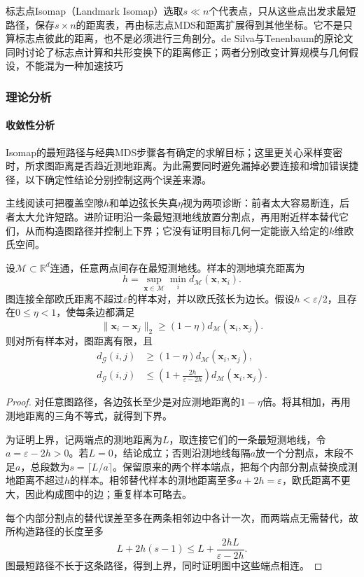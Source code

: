 标志点Isomap（Landmark Isomap）选取$s\ll n$个代表点，只从这些点出发求最短路径，保存$s\times n$的距离表，再由标志点MDS和距离扩展得到其他坐标。它不是只算标志点彼此的距离，也不是必须进行三角剖分。de Silva与Tenenbaum的原论文同时讨论了标志点计算和共形变换下的距离修正；两者分别改变计算规模与几何假设，不能混为一种加速技巧

\subsubsection{理论分析}
\label{sec:dim-isomap-theory}

\paragraph{收敛性分析}

Isomap的最短路径与经典MDS步骤各有确定的求解目标；这里更关心采样变密时，所求图距离是否趋近测地距离。为此需要同时避免漏掉必要连接和增加错误捷径，以下确定性结论分别控制这两个误差来源。

主线阅读可把覆盖空隙$h$和单边弦长失真$\eta$视为两项诊断：前者太大容易断连，后者太大允许短路。进阶证明沿一条最短测地线放置分割点，再用附近样本替代它们，从而构造图路径并控制上下界；它没有证明目标几何一定能嵌入给定的$k$维欧氏空间。

\begin{theorem}[覆盖条件下的图距离界]
  \label{thm:dim-isomap-bound}
  设$\mathcal{M}\subset\mathbb{R}^d$连通，任意两点间存在最短测地线。样本的测地填充距离为
  \[
    h=\sup_{\bm{x}\in\mathcal{M}}\min_i
      d_{\mathcal{M}}(\bm{x},\bm{x}_i).
  \]
  图连接全部欧氏距离不超过$\varepsilon$的样本对，并以欧氏弦长为边长。假设$h<\varepsilon/2$，且存在$0\leq\eta<1$，使每条边都满足
  \[
    \lVert\bm{x}_i-\bm{x}_j\rVert_2
    \geq(1-\eta)d_{\mathcal{M}}(\bm{x}_i,\bm{x}_j).
  \]
  则对所有样本对，图距离有限，且
  \begin{equation}
    \label{eq:dim-isomap-bound}
    \begin{aligned}
      d_{\mathcal{G}}(i,j)
        &\geq(1-\eta)d_{\mathcal{M}}(\bm{x}_i,\bm{x}_j),\\
      d_{\mathcal{G}}(i,j)
        &\leq\left(1+\frac{2h}{\varepsilon-2h}\right)
          d_{\mathcal{M}}(\bm{x}_i,\bm{x}_j).
    \end{aligned}
  \end{equation}
\end{theorem}
\begin{proof}
  对任意图路径，各边弦长至少是对应测地距离的$1-\eta$倍。将其相加，再用测地距离的三角不等式，就得到下界。

  为证明上界，记两端点的测地距离为$L$，取连接它们的一条最短测地线，令$a=\varepsilon-2h>0$。若$L=0$，结论成立；否则沿测地线每隔$a$放一个分割点，末段不足$a$，总段数为$s=\lceil L/a\rceil$。保留原来的两个样本端点，把每个内部分割点替换成测地距离不超过$h$的样本。相邻替代样本的测地距离至多$a+2h=\varepsilon$，欧氏距离不更大，因此构成图中的边；重复样本可略去。

  每个内部分割点的替代误差至多在两条相邻边中各计一次，而两端点无需替代，故所构造路径的长度至多
  \[
    L+2h(s-1)
    \leq L+\frac{2hL}{\varepsilon-2h}.
  \]
  图最短路径不长于这条路径，得到上界，同时证明图中这些端点相连。
\end{proof}

